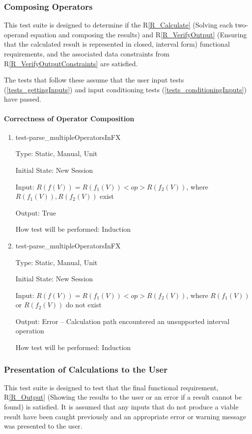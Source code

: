 \documentclass[12pt, titlepage]{article}
\newcommand{\rref}[1]{R\ref{#1}}
\begin{document}
\subsubsection{Composing Operators}
\label{tests_operatorComposition}
This test suite is designed to determine if the \rref{R_Calculate} (Solving 
each two-operand equation and composing the results) and \rref{R_VerifyOutput} 
(Ensuring that the calculated result is represented in closed, interval form) 
functional requirements, and the associated data constraints from 
\rref{R_VerifyOutputConstraints} are satisfied.

The tests that follow these assume that the user input tests 
(\ref{tests_gettingInputs}) and input conditioning tests 
(\ref{tests_conditioningInputs}) have passed.

\paragraph{Correctness of Operator Composition}

\begin{enumerate}
	
	\item{test-parse\_multipleOperatorsInFX}
	
	Type: Static, Manual, Unit
	
	Initial State: New Session
	
	Input: $R(f(V)) = R(f_1(V)) <op> R(f_2(V))$, where $R(f_1(V)), R(f_2(V))$ 
	exist
	
	Output: True
	
	How test will be performed: Induction\\
	
	\item{test-parse\_multipleOperatorsInFX}
	
	Type: Static, Manual, Unit
	
	Initial State: New Session
	
	Input: $R(f(V)) = R(f_1(V)) <op> R(f_2(V))$, where $R(f_1(V))$ or 
	$R(f_2(V))$ do not exist
	
	Output: Error -- Calculation path encountered an unsupported interval 
	operation
	
	How test will be performed: Induction\\
	
\end{enumerate}

\subsubsection{Presentation of Calculations to the User}
\label{tests_outputResults}
This test suite is designed to test that the final functional requirement, 
\rref{R_Output} (Showing the results to the user or an error if a result cannot 
be found) is satisfied. It is assumed that any inputs that do not produce a 
viable result have been caught previously and an appropriate error or warning 
message was presented to the user.
\end{document}
